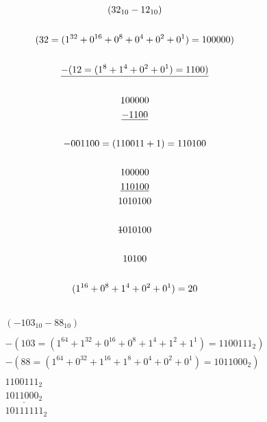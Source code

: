 \documentclass[12pt]{article}
\begin{document}
\subsection{}
\begin{gather*}
(32_{10} - 12_{10}) \\ \\
	(32 = (1^{32} + 0^{16} + 0^8 + 0^4 + 0^2 + 0^1) = 100000) \\ \\
	\underline{-(12 = (1^8 + 1^4 + 0^2 + 0^1) = 1100)} \\ \\
	100000 \\ \underline{-1100} \\ \\
	-001100 = (110011 + 1) = 110100 \\ \\
	100000 \\ \underline{110100} \\ 1010100 \\ \\
	\text{\sout{1}010100} \\ \\
	10100 \\ \\
	(1^{16} + 0^8 + 1^4 + 0^2 + 0^1) = 20
	\end{gather*}
\subsection{}
\begin{gather*}
(-103_{10}- 88_{10})\\ \\-(103 = (1^{64} + 1^{32} + 0^{16} + 0^8 + 1^4 + 1^2 + 1^1) = 1100111_2) \\-(88 = (1^{64} + 0^{32} + 1^{16} + 1^8 + 0^4 + 0^2 + 0^1) = 1011000_2)\\ \\1100111_2 \\\underline{1011000_2}\\ 10111111_2 \end{gather*}
\end{document}
